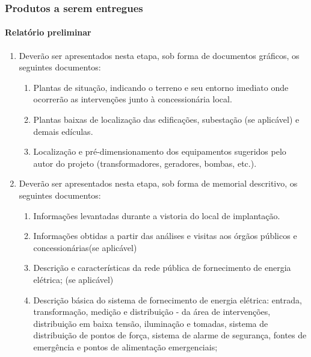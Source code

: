 \subsubsection{Produtos a serem entregues}

\paragraph{Relatório preliminar}

\begin{enumerate}
	
	\item Deverão ser apresentados nesta etapa, sob forma de documentos gráficos, os seguintes documentos:
		\begin{enumerate}
			\item Plantas de situação, indicando o terreno e seu entorno imediato onde ocorrerão as intervenções junto à concessionária local.
		
			\item Plantas baixas de localização das edificações, subestação (se aplicável) e demais edículas.
		
			\item Localização e pré-dimensionamento dos equipamentos sugeridos pelo autor do projeto (transformadores, geradores, bombas, etc.).
		\end{enumerate}

	\item Deverão ser apresentados nesta etapa, sob forma de memorial descritivo, os seguintes documentos:
		\begin{enumerate}
			\item Informações levantadas durante a vistoria do local de implantação.
			
			\item Informações obtidas a partir das análises e visitas aos órgãos públicos e concessionárias(se aplicável)
			
			\item Descrição e características da rede pública de fornecimento de energia elétrica; (se aplicável)

			\item Descrição básica do sistema de fornecimento de energia elétrica: entrada, transformação, medição e distribuição - da área de intervenções, distribuição em baixa tensão, iluminação e tomadas, sistema de distribuição de pontos de força, sistema de alarme de segurança, fontes de emergência e pontos de alimentação emergenciais; 


\end{enumerate}
\end{enumerate}
